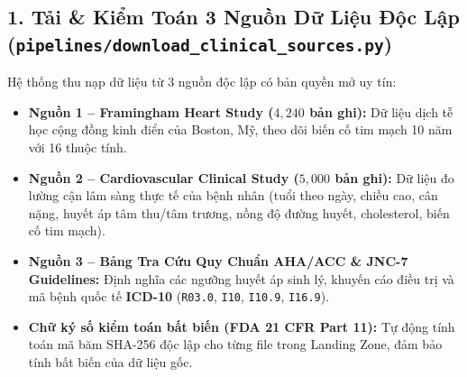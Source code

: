 \documentclass[11pt,a4paper]{article}
\begin{document}
\subsection{1. Tải \& Kiểm Toán 3 Nguồn Dữ Liệu Độc Lập (\texttt{pipelines/download_clinical_sources.py})}
Hệ thống thu nạp dữ liệu từ 3 nguồn độc lập có bản quyền mở uy tín:
\begin{itemize}
    \item \textbf{Nguồn 1 -- Framingham Heart Study ($4{,}240$ bản ghi):} Dữ liệu dịch tễ học cộng đồng kinh điển của Boston, Mỹ, theo dõi biến cố tim mạch 10 năm với 16 thuộc tính.
    \item \textbf{Nguồn 2 -- Cardiovascular Clinical Study ($5{,}000$ bản ghi):} Dữ liệu đo lường cận lâm sàng thực tế của bệnh nhân (tuổi theo ngày, chiều cao, cân nặng, huyết áp tâm thu/tâm trương, nồng độ đường huyết, cholesterol, biến cố tim mạch).
    \item \textbf{Nguồn 3 -- Bảng Tra Cứu Quy Chuẩn AHA/ACC \& JNC-7 Guidelines:} Định nghĩa các ngưỡng huyết áp sinh lý, khuyến cáo điều trị và mã bệnh quốc tế \textbf{ICD-10} (\texttt{R03.0}, \texttt{I10}, \texttt{I10.9}, \texttt{I16.9}).
    \item \textbf{Chữ ký số kiểm toán bất biến (FDA 21 CFR Part 11):} Tự động tính toán mã băm SHA-256 độc lập cho từng file trong Landing Zone, đảm bảo tính bất biến của dữ liệu gốc.
\end{itemize}
\end{document}
